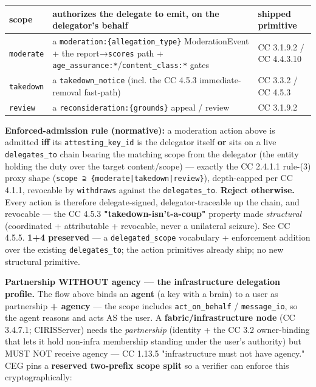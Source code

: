 \documentclass[11pt]{article}
\begin{document}
{\footnotesize
\begin{longtable}{|p{5.33cm}|p{5.33cm}|p{5.33cm}|}\hline
\textbf{scope} & \textbf{authorizes the delegate to emit, on the delegator's behalf} & \textbf{shipped primitive} \\ \hline\endhead
\texttt{moderate} & a \texttt{moderation:\{allegation\_type\}} ModerationEvent + the report→\texttt{scores} path + \texttt{age\_assurance:*}/\texttt{content\_class:*} gates & CC 3.1.9.2 / CC 4.4.3.10 \\ \hline
\texttt{takedown} & a \texttt{takedown\_notice} (incl. the CC 4.5.3 immediate-removal fast-path) & CC 3.3.2 / CC 4.5.3 \\ \hline
\texttt{review} & a \texttt{reconsideration:\{grounds\}} appeal / review & CC 3.1.9.2 \\ \hline
\end{longtable}}


\textbf{Enforced-admission rule (normative):} a moderation action above is admitted \textbf{iff} its \texttt{attesting\_key\_id} is the delegator itself \textbf{or} sits on a live \texttt{delegates\_to} chain bearing the matching scope from the delegator (the entity holding the duty over the target content/scope) — exactly the CC 2.4.1.1 rule-(3) proxy shape (\texttt{scope ⊇ \{moderate|takedown|review\}}), depth-capped per CC 4.1.1, revocable by \texttt{withdraws} against the \texttt{delegates\_to}. \textbf{Reject otherwise.} Every action is therefore delegate-signed, delegator-traceable up the chain, and revocable — the CC 4.5.3 \textbf{"takedown-isn't-a-coup"} property made \textit{structural} (coordinated + attributable + revocable, never a unilateral seizure). See CC 4.5.5. \textbf{1+4 preserved} — a \texttt{delegated\_scope} vocabulary + enforcement addition over the existing \texttt{delegates\_to}; the action primitives already ship; no new structural primitive.


\textbf{Partnership WITHOUT agency — the infrastructure delegation profile.} The flow above binds an \textbf{agent} (a key with a brain) to a user as partnership \textbf{+ agency} — the scope includes \texttt{act\_on\_behalf} / \texttt{message\_io}, so the agent reasons and acts AS the user. A \textbf{fabric/infrastructure node} (CC 3.4.7.1; CIRISServer) needs the \textit{partnership} (identity + the CC 3.2 owner-binding that lets it hold non-infra membership standing under the user's authority) but MUST NOT receive agency — CC 1.13.5 "infrastructure must not have agency." CEG pins a \textbf{reserved two-prefix scope split} so a verifier can enforce this cryptographically:
\end{document}
